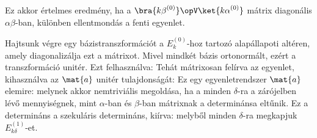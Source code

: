     Ez akkor értelmes eredmény, ha a $\bra{{k\beta}^{(0)}}\opV\ket{{k\alpha}^{(0)}}$ mátrix diagonális $\alpha\beta$-ban, különben ellentmondás a fenti egyenlet.
    
    Hajtsunk végre egy bázistranszformációt a $E_k^{(0)}$-hoz tartozó alapállapoti altéren, amely diagonalizálja ezt a mátrixot. 
    Mivel mindkét bázis ortonormált, ezért a transzformáció unitér.
   Ezt felhasználva:
    Tehát mátrixosan felírva az egyenlet, kihasználva az $\mat{a}$ unitér tulajdonságát:
    Ez egy egyenletrendszer $\mat{a}$ elemire:
    melynek akkor nemtriviális megoldása, ha a minden $\delta$-ra a zárójelben lévő mennyiségnek, mint $\alpha$-ban és $\beta$-ban mátrixnak a determinánsa eltűnik.
   Ez a determináns a szekuláris determináns, kiírva:
    melyből minden $\delta$-ra megkapjuk $E_{k\delta}^{(1)}$-et.
    
